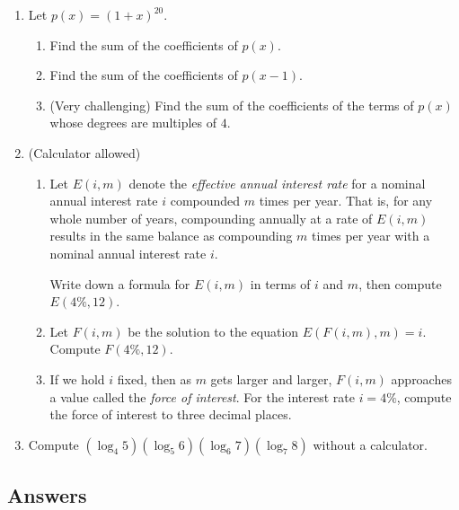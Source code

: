 \begin{enumerate}[resume]
\item Let $p(x) = (1 + x)^{20}$.
\begin{enumerate}
\item Find the sum of the coefficients of $p(x)$.
\item Find the sum of the coefficients of $p(x - 1)$.
\item (Very challenging) Find the sum of the coefficients of the terms of $p(x)$ whose degrees are multiples of $4$.
\end{enumerate}
\item (Calculator allowed)
\begin{enumerate}
\item Let $E(i,m)$ denote the \emph{effective annual interest rate} for a nominal annual interest rate $i$ compounded $m$ times per year. That is, for any whole number of years, compounding annually at a rate of $E(i,m)$ results in the same balance as compounding $m$ times per year with a nominal annual interest rate $i$.\par Write down a formula for $E(i,m)$ in terms of $i$ and $m$, then compute $E(4\%, 12)$.
\item Let $F(i,m)$ be the solution to the equation $E(F(i,m),m) = i$. Compute $F(4\%, 12)$.
\item If we hold $i$ fixed, then as $m$ gets larger and larger, $F(i,m)$ approaches a value called the \emph{force of interest}. For the interest rate $i = 4\%$, compute the force of interest to three decimal places.
\end{enumerate}
\item Compute $(\log_4 5)(\log_5 6)(\log_6 7)(\log_7 8)$ without a calculator.
\end{enumerate}


\newpage
\subsection{Answers}

